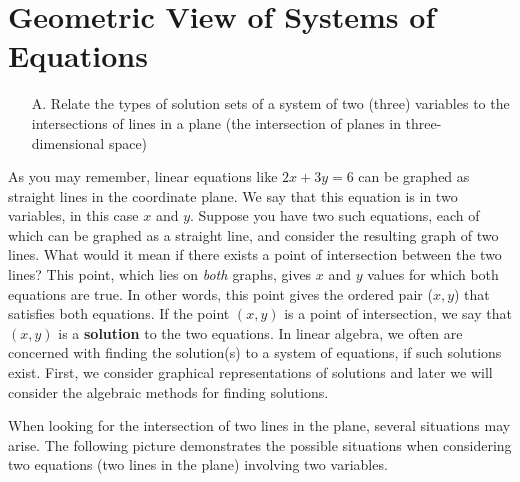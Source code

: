 \section{Geometric View of Systems of Equations}
\label{sec:systems-geometric}

\begin{outcome}
\begin{enumerate}
\item[A.] Relate the types of solution sets of a system of two (three)
variables to the intersections of lines in a plane (the intersection of
planes in three-dimensional space)
\end{enumerate}
\end{outcome}

As you may remember, linear equations like $2x+3y=6$ can be graphed as
straight lines in the coordinate plane. We say that this equation is
in two variables, in this case $x$ and $y$.  Suppose you have two such
equations, each of which can be graphed as a straight line, and consider
the resulting graph of two lines. What would it mean if there exists a
point of intersection between the two lines? This point, which lies on
{\em both \em} graphs, gives $x$ and $y$ values for which both
equations are true. In other words, this point gives the ordered pair
($x,y$) that satisfies both equations.  If the point $\left( x, y
\right)$ is a point of intersection, we say that $\left( x, y \right)$
is a \textbf{solution} to the two equations. In linear algebra, we
often are concerned with finding the solution(s) to a system of
equations, if such solutions exist.  First, we consider graphical
representations of solutions and later we will consider the algebraic
methods for finding solutions.

When looking for the intersection of two lines in the plane, several situations may arise. The following picture demonstrates the possible situations
when considering two equations (two lines in the plane) involving two variables.



